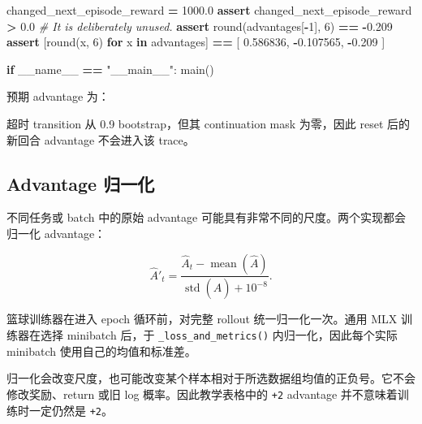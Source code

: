 \documentclass[
  chinese,
  11pt,
  letterpaper,
]{article}
\newenvironment{Shaded}{\begin{snugshade}}{\end{snugshade}}
\newcommand{\BuiltInTok}[1]{#1}
\newcommand{\CommentTok}[1]{\textcolor[rgb]{0.56,0.35,0.01}{\textit{#1}}}
\newcommand{\ControlFlowTok}[1]{\textcolor[rgb]{0.13,0.29,0.53}{\textbf{#1}}}
\newcommand{\DecValTok}[1]{\textcolor[rgb]{0.00,0.00,0.81}{#1}}
\newcommand{\FloatTok}[1]{\textcolor[rgb]{0.00,0.00,0.81}{#1}}
\newcommand{\KeywordTok}[1]{\textcolor[rgb]{0.13,0.29,0.53}{\textbf{#1}}}
\newcommand{\NormalTok}[1]{#1}
\newcommand{\OperatorTok}[1]{\textcolor[rgb]{0.81,0.36,0.00}{\textbf{#1}}}
\newcommand{\StringTok}[1]{\textcolor[rgb]{0.31,0.60,0.02}{#1}}
\newcommand{\VariableTok}[1]{\textcolor[rgb]{0.00,0.00,0.00}{#1}}
\renewenvironment{Shaded}{\par\smallskip}{\par\smallskip}
\begin{document}
\begin{Shaded}
\begin{Highlighting}[]
\NormalTok{    changed\_next\_episode\_reward }\OperatorTok{=} \FloatTok{1000.0}
    \ControlFlowTok{assert}\NormalTok{ changed\_next\_episode\_reward }\OperatorTok{\textgreater{}} \FloatTok{0.0}  \CommentTok{\# It is deliberately unused.}
    \ControlFlowTok{assert} \BuiltInTok{round}\NormalTok{(advantages[}\OperatorTok{{-}}\DecValTok{1}\NormalTok{], }\DecValTok{6}\NormalTok{) }\OperatorTok{==} \OperatorTok{{-}}\FloatTok{0.209}
    \ControlFlowTok{assert}\NormalTok{ [}\BuiltInTok{round}\NormalTok{(x, }\DecValTok{6}\NormalTok{) }\ControlFlowTok{for}\NormalTok{ x }\KeywordTok{in}\NormalTok{ advantages] }\OperatorTok{==}\NormalTok{ [}
        \FloatTok{0.586836}\NormalTok{, }\OperatorTok{{-}}\FloatTok{0.107565}\NormalTok{, }\OperatorTok{{-}}\FloatTok{0.209}
\NormalTok{    ]}


\ControlFlowTok{if} \VariableTok{\_\_name\_\_} \OperatorTok{==} \StringTok{"\_\_main\_\_"}\NormalTok{:}
\NormalTok{    main()}
\end{Highlighting}
\end{Shaded}

预期 advantage 为：

\begin{Shaded}
\begin{Highlighting}[]
\NormalTok{[0.586836, {-}0.107565, {-}0.209]}
\end{Highlighting}
\end{Shaded}

超时 transition 从 0.9 bootstrap，但其 continuation mask 为零，因此
reset 后的新回合 advantage 不会进入该 trace。

\subsection{Advantage 归一化}\label{advantage-ux5f52ux4e00ux5316}

不同任务或 batch 中的原始 advantage
可能具有非常不同的尺度。两个实现都会归一化 advantage：

\[
\widehat A'_t
=
\frac{\widehat A_t-\operatorname{mean}(\widehat A)}
{\operatorname{std}(\widehat A)+10^{-8}}.
\]

篮球训练器在进入 epoch 循环前，对完整 rollout 统一归一化一次。通用 MLX
训练器在选择 minibatch 后，于 \texttt{\_loss\_and\_metrics()}
内归一化，因此每个实际 minibatch 使用自己的均值和标准差。

归一化会改变尺度，也可能改变某个样本相对于所选数据组均值的正负号。它不会修改奖励、return
或旧 log 概率。因此教学表格中的 \texttt{+2} advantage
并不意味着训练时一定仍然是 \texttt{+2}。
\end{document}
